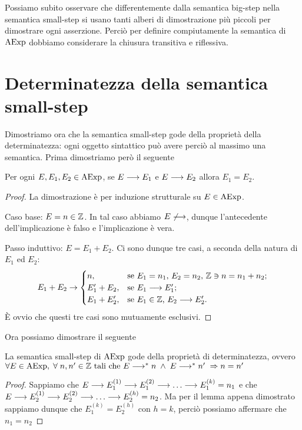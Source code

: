 Possiamo subito osservare che differentemente dalla semantica big-step
nella semantica small-step si usano tanti alberi di dimostrazione più piccoli per dimostrare
ogni asserzione. Perciò per definire compiutamente la semantica di $\mathrm{AExp}$ dobbiamo considerare la chiusura transitiva e riflessiva.

\section{Determinatezza della semantica small-step} 
Dimostriamo ora che la semantica small-step gode della proprietà della
determinatezza: ogni oggetto sintattico può avere perciò al massimo
una semantica. Prima dimostriamo però il seguente

\begin{teorema}
Per ogni $E, E_1, E_2 \in \mathrm{AExp}$, se $E \longrightarrow E_1$ e $E \longrightarrow E_2$
allora $E_1 = E_2$.
\end{teorema}

\begin{proof}
La dimostrazione è per induzione strutturale su $E \in \mathrm{AExp}$.

Caso base: $E = n \in \mathbb{Z}$.
In tal caso abbiamo $E \not \longrightarrow$, dunque l'antecedente dell'implicazione
è falso e l'implicazione è vera.

Passo induttivo: $E = E_1 + E_2$.
Ci sono dunque tre casi, a seconda della natura di $E_1$ ed $E_2$:
\[
  E_1 + E_2
    \rightarrow
      \begin{cases}
        n,          &\text{se $E_1 = n_1$, $E_2 = n_2$,
                           $\mathbb{Z} \ni n = n_1 + n_2$;} \\
        E_1' + E_2, &\text{se $E_1 \longrightarrow E_1'$;} \\
        E_1 + E_2', &\text{se $E_1 \in \mathbb{Z}$, $E_2 \longrightarrow E_2'$.}
      \end{cases}
\]
È ovvio che questi tre casi sono mutuamente esclusivi.
\end{proof}

Ora possiamo dimostrare il seguente

\begin{teorema}[Determinatezza]
La semantica small-step di $\mathrm{AExp}$ gode della proprietà di determinatezza, ovvero
$\forall E \in \mathrm{AExp}, \; \forall \; n, n' \in \mathbb{Z} \text{ tali che } E \longrightarrow ^* n \; \land \; E \longrightarrow ^* n' \; \Rightarrow n = n'$
\end{teorema}

\begin{proof}
Sappiamo che $E \ssarrow E_1^{(1)} \ssarrow E_1^{(2)} \ssarrow \dots \ssarrow E_1^{(k)} = n_1$ e che $E \ssarrow E_2^{(1)} \ssarrow E_2^{(2)} \ssarrow \dots \ssarrow E_2^{(h)} = n_2$.
Ma per il lemma appena dimostrato sappiamo dunque che $E_1^{(k)} = E_2^{(h)} \text{ con } h = k$, perciò possiamo affermare che $n_1 = n_2$
\end{proof}

